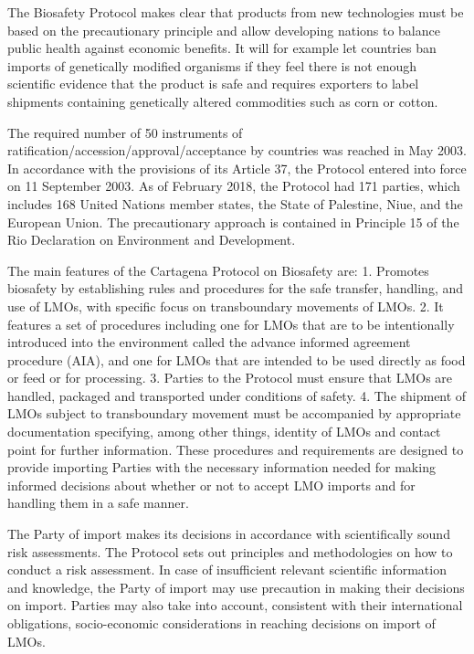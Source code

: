 \documentclass[
]{book}
\begin{document}
The Biosafety Protocol makes clear that products from new technologies must be based on the precautionary principle and allow developing nations to balance public health against economic benefits. It will for example let countries ban imports of genetically modified organisms if they feel there is not enough scientific evidence that the product is safe and requires exporters to label shipments containing genetically altered commodities such as corn or cotton.

The required number of 50 instruments of ratification/accession/approval/acceptance by countries was reached in May 2003. In accordance with the provisions of its Article 37, the Protocol entered into force on 11 September 2003. As of February 2018, the Protocol had 171 parties, which includes 168 United Nations member states, the State of Palestine, Niue, and the European Union.
The precautionary approach is contained in Principle 15 of the Rio Declaration on Environment and Development.

The main features of the Cartagena Protocol on Biosafety are:
1. Promotes biosafety by establishing rules and procedures for the safe transfer, handling, and use of LMOs, with specific focus on transboundary movements of LMOs.
2. It features a set of procedures including one for LMOs that are to be intentionally introduced into the environment called the advance informed agreement procedure (AIA), and one for LMOs that are intended to be used directly as food or feed or for processing.
3. Parties to the Protocol must ensure that LMOs are handled, packaged and transported under conditions of safety.
4. The shipment of LMOs subject to transboundary movement must be accompanied by appropriate documentation specifying, among other things, identity of LMOs and contact point for further information.
These procedures and requirements are designed to provide importing Parties with the necessary information needed for making informed decisions about whether or not to accept LMO imports and for handling them in a safe manner.

The Party of import makes its decisions in accordance with scientifically sound risk assessments. The Protocol sets out principles and methodologies on how to conduct a risk assessment. In case of insufficient relevant scientific information and knowledge, the Party of import may use precaution in making their decisions on import. Parties may also take into account, consistent with their international obligations, socio-economic considerations in reaching decisions on import of LMOs.
\end{document}
